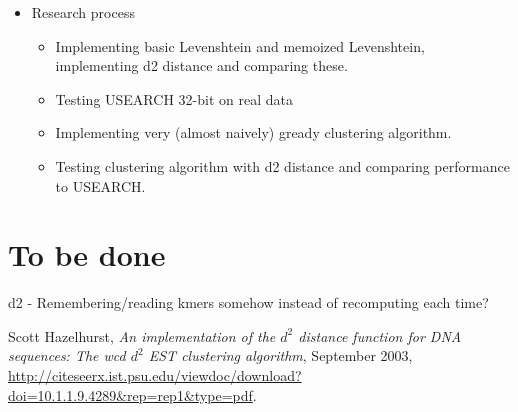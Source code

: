 \documentclass[11pt,a4paper]{article}
\begin{document}
\begin{itemize}
  \item Research process
    \begin{itemize}
      \item Implementing basic Levenshtein and memoized Levenshtein,
        implementing d2 distance and comparing these.
      \item Testing USEARCH 32-bit on real data
      \item Implementing very (almost naively) gready clustering algorithm.
      \item Testing clustering algorithm with d2 distance and comparing
        performance to USEARCH.
    \end{itemize}
\end{itemize}


\section{To be done}
d2 - Remembering/reading kmers somehow instead of recomputing each time?


\begin{thebibliography}{9}
    Scott Hazelhurst,
    \emph{An implementation of the $d^2$ distance function for DNA
      sequences: The wcd $d^2$ EST clustering algorithm},
      September 2003,
      \url{http://citeseerx.ist.psu.edu/viewdoc/download?doi=10.1.1.9.4289&rep=rep1&type=pdf}.
\end{thebibliography}
\end{document}
